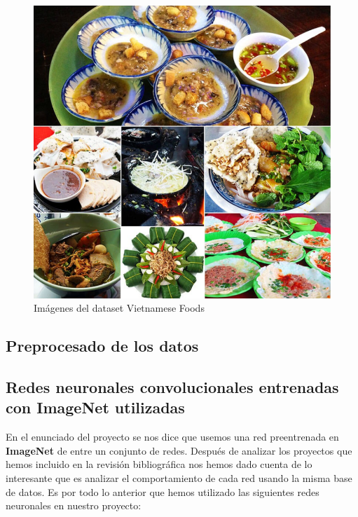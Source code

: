 \begin{figure}[H]
  \centering
  \includegraphics[width=0.5\linewidth]{Imagenes/comida-vietnamita.png}
  \caption{Imágenes del dataset Vietnamese Foods}
  \label{fig:sub-first}
\end{figure}

\newpage

\subsection{Preprocesado de los datos}


\subsection{Redes neuronales convolucionales entrenadas con ImageNet utilizadas}

\vspace{5 mm}

En el enunciado del proyecto se nos dice que usemos una red preentrenada en \textbf{ImageNet} de entre un conjunto de redes. Después de analizar los proyectos que hemos incluido en la revisión bibliográfica nos hemos dado cuenta de lo interesante que es analizar el comportamiento de cada red usando la misma base de datos. Es por todo lo anterior que hemos utilizado las siguientes redes neuronales en nuestro proyecto:

